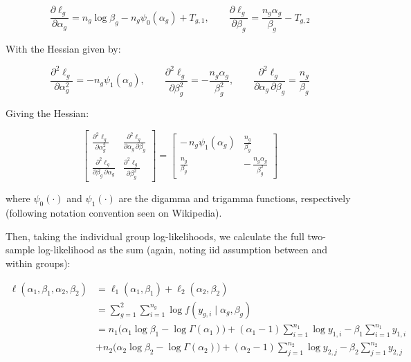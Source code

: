\documentclass[
]{article}
\begin{document}
\[
\frac{\partial \ell_g}{\partial \alpha_g}
= n_g\log \beta_g - n_g\psi_{0}(\alpha_g) + T_{g,1}, 
\qquad
\frac{\partial \ell_g}{\partial \beta_g}
= \frac{n_g\alpha_g}{\beta_g} - T_{g,2}
\]

With the Hessian given by:

\[
\frac{\partial^2 \ell_g}{\partial \alpha_g^2}
= -n_g \psi_{1}(\alpha_g),\qquad
\frac{\partial^2 \ell_g}{\partial \beta_g^2}
= -\frac{n_g\alpha_g}{\beta_g^2},\qquad
\frac{\partial^2 \ell_g}{\partial \alpha_g\,\partial \beta_g}
=\frac{n_g}{\beta_g}
\]

Giving the Hessian:

\[
\begin{bmatrix}
\displaystyle \frac{\partial^2 \ell_g}{\partial \alpha_g^2} &
\displaystyle \frac{\partial^2 \ell_g}{\partial \alpha_g \,\partial \beta_g} \\[1.2em]
\displaystyle \frac{\partial^2 \ell_g}{\partial \beta_g \,\partial \alpha_g} &
\displaystyle \frac{\partial^2 \ell_g}{\partial \beta_g^2}
\end{bmatrix}
=
\begin{bmatrix}
-\,n_g \psi_{1}(\alpha_g) & \tfrac{n_g}{\beta_g} \\[0.8em]
\tfrac{n_g}{\beta_g} & -\,\tfrac{n_g \alpha_g}{\beta_g^2}
\end{bmatrix}
\]

where \(\psi_{0}(\cdot)\) and \(\psi_{1}(\cdot)\) are the digamma and
trigamma functions, respectively (following notation convention seen on
Wikipedia).

Then, taking the individual group log-likelihoods, we calculate the full
two-sample log-likelihood as the sum (again, noting iid assumption
between and within groups):

\[
\begin{aligned}
\ell(\alpha_1,\beta_1,\alpha_2,\beta_2)
&= \ell_1(\alpha_1,\beta_1)+\ell_2(\alpha_2,\beta_2) \\ 
&= \sum_{g=1}^{2}\sum_{i=1}^{n_g}\log f(y_{g,i}\mid \alpha_g,\beta_g) \\ 
&= n_1\Big(\alpha_1\log\beta_1-\log\Gamma(\alpha_1)\Big)
+(\alpha_1-1)\sum_{i=1}^{n_1}\log y_{1,i}
-\beta_1\sum_{i=1}^{n_1} y_{1,i} \\ 
&+ n_2\Big(\alpha_2\log\beta_2-\log\Gamma(\alpha_2)\Big)
+(\alpha_2-1)\sum_{j=1}^{n_2}\log y_{2,j}
-\beta_2\sum_{j=1}^{n_2} y_{2,j} \\
\end{aligned}
\]

\newpage
\end{document}

